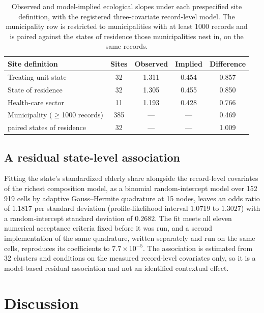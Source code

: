 \documentclass[11pt]{article}
\begin{document}
\begin{table}[t]
\centering
\caption{Observed and model-implied ecological slopes under each
prespecified site definition, with the registered three-covariate
record-level model.  The municipality row is restricted to municipalities
with at least 1000 records and is paired against the states of residence
those municipalities nest in, on the same records.}
\label{tab:sites}
\begin{tabular}{lcccc}
\toprule
Site definition & Sites & Observed & Implied & Difference \\
\midrule
Treating-unit state        & 32  & 1.311 & 0.454 & 0.857 \\
State of residence         & 32  & 1.305 & 0.455 & 0.850 \\
Health-care sector         & 11  & 1.193 & 0.428 & 0.766 \\
Municipality ($\geq$1000 records) & 385 & ---   & ---   & 0.469 \\
\;\;paired states of residence    & 32  & ---   & ---   & 1.009 \\
\bottomrule
\end{tabular}
\end{table}

\subsection{A residual state-level association}

Fitting the state's standardized elderly share alongside the
record-level covariates of the richest composition model, as a binomial
random-intercept model over 152\,919 cells by adaptive Gauss--Hermite
quadrature at 15 nodes, leaves an odds ratio of $1.1817$ per standard
deviation (profile-likelihood interval $1.0719$ to $1.3027$) with a
random-intercept standard deviation of $0.2682$.  The fit meets all
eleven numerical acceptance criteria fixed before it was run, and a
second implementation of the same quadrature, written separately and
run on the same cells, reproduces its coefficients to
$7.7\times10^{-5}$.  The association is estimated from 32 clusters and conditions
on the measured record-level covariates only, so it is a model-based
residual association and not an identified contextual effect.

\section{Discussion}
\label{sec:discussion}
\end{document}
